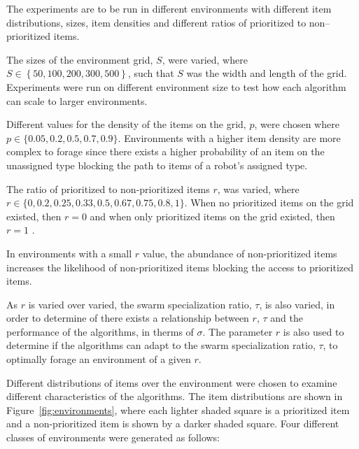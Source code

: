 The experiments are to be run in different environments with different item distributions, sizes, item densities and different ratios of prioritized to non--prioritized items. 

The sizes of the environment grid, $S$, were varied, where $S\in \left\{ 50, 100, 200, 300, 500\right\}$, such that $S$ was the width and length of the grid.  Experiments were run on different environment size to test how each algorithm can scale to larger environments.

Different values for the density of the items on the grid, $p$, were chosen where $p\in \{ 0.05,\allowbreak 0.2,\allowbreak 0.5,\allowbreak 0.7,\allowbreak 0.9\}$. Environments with a higher item density are more complex to forage since there exists a higher probability of an item on the unassigned type blocking the path to items of a robot's assigned type.

The ratio of prioritized to non-prioritized items $r$, was varied, where $r\in \{0,\allowbreak 0.2,\allowbreak 0.25,\allowbreak 0.33,\allowbreak 0.5,\allowbreak 0.67,\allowbreak 0.75,\allowbreak 0.8, 1\}$. When no prioritized items on the grid existed, then $r=0$ and when only prioritized items on the grid existed, then $r=1$ .

In environments with a small $r$ value, the abundance of non-prioritized items increases the likelihood of non-prioritized items blocking the access to prioritized items. 

As $r$ is varied over varied, the swarm specialization ratio, $\tau$, is also varied, in order to determine of there exists a relationship between $r$, $\tau$ and the performance of the algorithms, in therms of $\sigma$. The parameter $r$ is also used to determine if the algorithms can adapt to the swarm specialization ratio, $\tau$, to optimally forage an environment of a given $r$. 

Different distributions of items over the environment were chosen to examine different characteristics of the algorithms. The item distributions are shown in Figure~\ref{fig:environments}, where each lighter shaded square is a prioritized item and a non-prioritized item is shown by a darker shaded square. Four different classes of environments were generated as follows:

